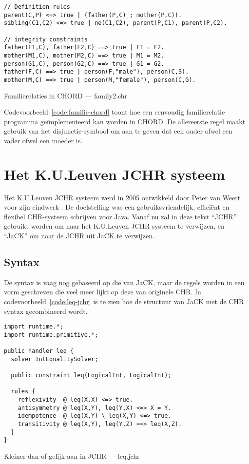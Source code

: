 \begin{exCode}[bhp]
\begin{Verbatim}[frame=single]
// Definition rules
parent(C,P) <=> true | (father(P,C) ; mother(P,C)).
sibling(C1,C2) <=> true | ne(C1,C2), parent(P,C1), parent(P,C2).

// integrity constraints
father(F1,C), father(F2,C) ==> true | F1 = F2.
mother(M1,C), mother(M2,C) ==> true | M1 = M2.
person(G1,C), person(G2,C) ==> true | G1 = G2.
father(F,C) ==> true | person(F,"male"), person(C,S).
mother(M,C) ==> true | person(M,"female"), person(C,G).
\end{Verbatim}
\caption{Familierelaties in CHORD --- family2.chr}
\label{code:familie-chord}
\end{exCode}
Codevoorbeeld~\ref{code:familie-chord} toont hoe een eenvoudig familierelatie programma ge\"implementeerd kan worden in CHORD. De allereerste regel maakt gebruik van het disjunctie-symbool \code{;} om aan te geven dat een ouder ofwel een vader ofwel een moeder is.

\section{Het K.U.Leuven JCHR systeem}

Het K.U.Leuven JCHR systeem werd in 2005 ontwikkeld door Peter van Weert voor zijn eindwerk \cite{jchr_thesis}. De doelstelling was een gebruiksvriendelijk, effici\"ent en flexibel CHR-systeem schrijven voor Java. Vanaf nu zal in deze tekst ``JCHR'' gebruikt worden om naar het K.U.Leuven JCHR systeem te verwijzen, en ``JaCK'' om naar de JCHR uit JaCK te verwijzen.

\subsection{Syntax}

De syntax is vaag nog gebaseerd op die van JaCK, maar de regels worden in een vorm geschreven die veel meer lijkt op deze van originele CHR. In codevoorbeeld~\ref{code:leq-jchr} is te zien hoe de structuur van JaCK met de CHR syntax gecombineerd wordt.
\begin{exCode}
\begin{Verbatim}[frame=single]
import runtime.*;
import runtime.primitive.*;

public handler leq {
  solver IntEqualitySolver;

  public constraint leq(LogicalInt, LogicalInt);

  rules {
    reflexivity  @ leq(X,X) <=> true.
    antisymmetry @ leq(X,Y), leq(Y,X) <=> X = Y.
    idempotence  @ leq(X,Y) \ leq(X,Y) <=> true.
    transitivity @ leq(X,Y), leq(Y,Z) ==> leq(X,Z).
  }
}

\end{Verbatim}
\caption{Kleiner-dan-of-gelijk-aan in JCHR --- leq.jchr}
\label{code:leq-jchr}
\end{exCode}
